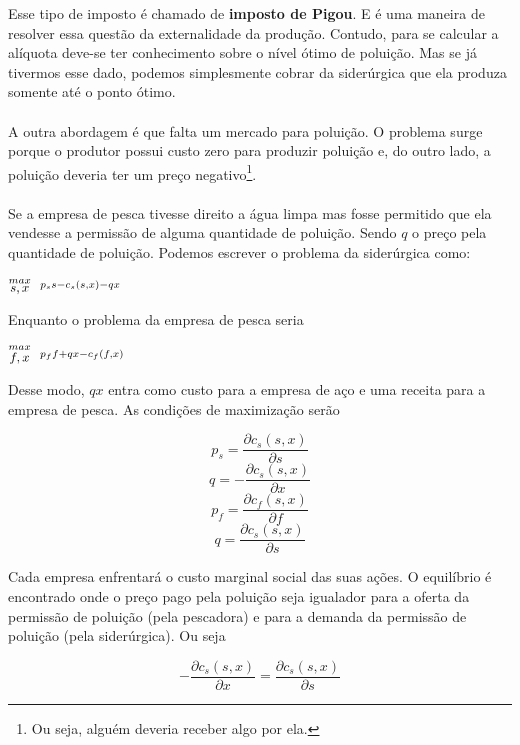 \documentclass[a4paper,11pt,oneside]{book}
\theoremstyle{definition}
\theoremstyle{break}
\begin{document}
Esse tipo de imposto é chamado de \textbf{imposto de Pigou}. E é uma maneira de resolver essa questão da externalidade da produção. Contudo, para se calcular a alíquota deve-se ter conhecimento sobre o nível ótimo de poluição. Mas se já tivermos esse dado, podemos simplesmente cobrar da siderúrgica que ela produza somente até o ponto ótimo.
\\~\\
A outra abordagem é que falta um mercado para poluição. O problema surge porque o produtor possui custo zero para produzir poluição e, do outro lado, a poluição deveria ter um preço negativo\footnote{Ou seja, alguém deveria receber algo por ela.}.
\\~\\
Se a empresa de pesca tivesse direito a água limpa mas fosse permitido que ela vendesse a permissão de alguma quantidade de poluição. Sendo $q$ o preço pela quantidade de poluição. Podemos escrever o problema da siderúrgica como:

\begin{center}
	\LARGE $ \stackrel{max}{\text{\small $s,x$}} \ \ \stackrel{p_ss - c_s(s,x) - qx}{\ } $ %
\end{center}

Enquanto o problema da empresa de pesca seria

\begin{center}
	\LARGE $ \stackrel{max}{\text{\small $f,x$}} \ \ %
	\stackrel{p_ff + qx - c_f(f,x)}{\ } $ %
\end{center}

Desse modo, $qx$ entra como custo para a empresa de aço e uma receita para a empresa de pesca. As condições de maximização serão 

$$ p_s = \frac{\partial c_s(s,x)}{\partial s} $$
$$ q = - \frac{\partial c_s(s,x)}{\partial x} $$
$$ p_f = \frac{\partial c_f(s,x)}{\partial f} $$
$$ q = \frac{\partial c_s(s,x)}{\partial s} $$

Cada empresa enfrentará o custo marginal social das suas ações. O equilíbrio é encontrado onde o preço pago pela poluição seja igualador para a oferta da permissão de poluição (pela pescadora) e para a demanda da permissão de poluição (pela siderúrgica). Ou seja

$$-\frac{\partial c_s(s,x)}{\partial x} = \frac{\partial c_s(s,x)}{\partial s}$$
\end{document}
